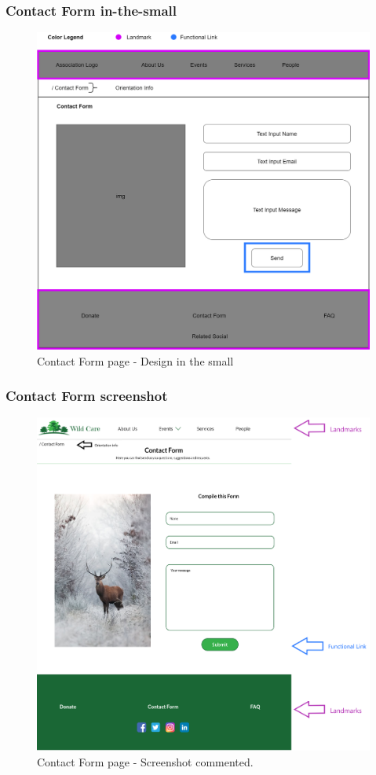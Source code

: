 \subsubsection{Contact Form in-the-small}
\begin{figure}[h!]
	\centering
	\begin{minipage}[b]{1\textwidth}
    		\includegraphics[width=\textwidth]{./assets/contactform.png}
		\caption{Contact Form page - Design in the small}
	\end{minipage}
\end{figure}
\FloatBarrier

\clearpage

\subsubsection{Contact Form screenshot}
\begin{figure}[h!]
	\centering
	\begin{minipage}[b]{1\textwidth}
    		\includegraphics[width=\textwidth]{./assets/mockups/contactform_commented.png}
		\caption{Contact Form page - Screenshot commented.}
	\end{minipage}
\end{figure}
\FloatBarrier